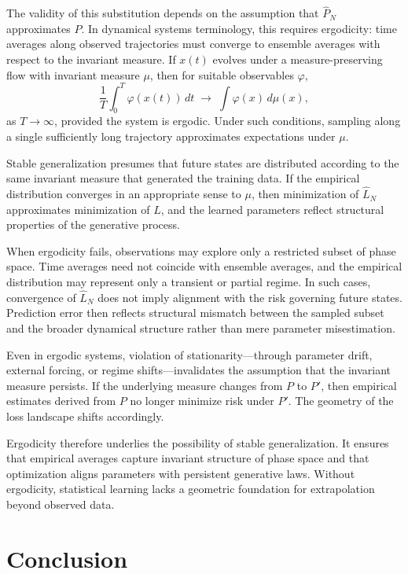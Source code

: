 \documentclass[12pt]{book}
\begin{document}
The validity of this substitution depends on the assumption that $\hat{P}_N$ approximates $P$. In dynamical systems terminology, this requires ergodicity: time averages along observed trajectories must converge to ensemble averages with respect to the invariant measure. If $x(t)$ evolves under a measure-preserving flow with invariant measure $\mu$, then for suitable observables $\varphi$,
\[
\frac{1}{T}\int_0^T \varphi(x(t))\,dt
\;\longrightarrow\;
\int \varphi(x)\, d\mu(x),
\]
as $T \to \infty$, provided the system is ergodic. Under such conditions, sampling along a single sufficiently long trajectory approximates expectations under $\mu$.

Stable generalization presumes that future states are distributed according to the same invariant measure that generated the training data. If the empirical distribution converges in an appropriate sense to $\mu$, then minimization of $\hat{L}_N$ approximates minimization of $L$, and the learned parameters reflect structural properties of the generative process.

When ergodicity fails, observations may explore only a restricted subset of phase space. Time averages need not coincide with ensemble averages, and the empirical distribution may represent only a transient or partial regime. In such cases, convergence of $\hat{L}_N$ does not imply alignment with the risk governing future states. Prediction error then reflects structural mismatch between the sampled subset and the broader dynamical structure rather than mere parameter misestimation.

Even in ergodic systems, violation of stationarity---through parameter drift, external forcing, or regime shifts---invalidates the assumption that the invariant measure persists. If the underlying measure changes from $P$ to $P'$, then empirical estimates derived from $P$ no longer minimize risk under $P'$. The geometry of the loss landscape shifts accordingly.

Ergodicity therefore underlies the possibility of stable generalization. It ensures that empirical averages capture invariant structure of phase space and that optimization aligns parameters with persistent generative laws. Without ergodicity, statistical learning lacks a geometric foundation for extrapolation beyond observed data.

\section{Conclusion}
\end{document}
